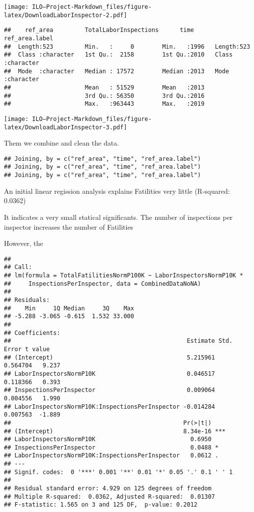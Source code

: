 \documentclass[
]{article}
\begin{document}
\texttt{[image: ILO---Project-Markdown\_files/figure-latex/DownloadLaborInspector-2.pdf]}

\begin{verbatim}
##    ref_area         TotalLaborInspections      time      ref_area.label    
##  Length:523         Min.   :     0        Min.   :1996   Length:523        
##  Class :character   1st Qu.:  2158        1st Qu.:2010   Class :character  
##  Mode  :character   Median : 17572        Median :2013   Mode  :character  
##                     Mean   : 51529        Mean   :2013                     
##                     3rd Qu.: 56350        3rd Qu.:2016                     
##                     Max.   :963443        Max.   :2019
\end{verbatim}

\texttt{[image: ILO---Project-Markdown\_files/figure-latex/DownloadLaborInspector-3.pdf]}

Them we combine and clean the data.

\begin{verbatim}
## Joining, by = c("ref_area", "time", "ref_area.label")
## Joining, by = c("ref_area", "time", "ref_area.label")
## Joining, by = c("ref_area", "time", "ref_area.label")
\end{verbatim}

An initial linear regission analysis explains Fatilities very little
(R-squared: 0.0362)

It indicates a very small statical significants. The number of
inspections per inspector increases the number of Fatilities

However, the

\begin{verbatim}
## 
## Call:
## lm(formula = TotalFatilitiesNormP100K ~ LaborInspectorsNormP10K * 
##     InspectionsPerInspector, data = CombinedDataNoNA)
## 
## Residuals:
##    Min     1Q Median     3Q    Max 
## -5.288 -3.065 -0.615  1.532 33.000 
## 
## Coefficients:
##                                                  Estimate Std. Error t value
## (Intercept)                                      5.215961   0.564704   9.237
## LaborInspectorsNormP10K                          0.046517   0.118366   0.393
## InspectionsPerInspector                          0.009064   0.004556   1.990
## LaborInspectorsNormP10K:InspectionsPerInspector -0.014284   0.007563  -1.889
##                                                 Pr(>|t|)    
## (Intercept)                                     8.34e-16 ***
## LaborInspectorsNormP10K                           0.6950    
## InspectionsPerInspector                           0.0488 *  
## LaborInspectorsNormP10K:InspectionsPerInspector   0.0612 .  
## ---
## Signif. codes:  0 '***' 0.001 '**' 0.01 '*' 0.05 '.' 0.1 ' ' 1
## 
## Residual standard error: 4.929 on 125 degrees of freedom
## Multiple R-squared:  0.0362, Adjusted R-squared:  0.01307 
## F-statistic: 1.565 on 3 and 125 DF,  p-value: 0.2012
\end{verbatim}
\end{document}
